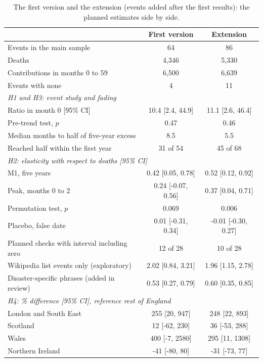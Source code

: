 \documentclass[11pt,a4paper]{article}
\begin{document}
\begin{table}[tbp]\centering\small\begin{threeparttable}\caption{The first version and the extension (events added after the first results): the planned estimates side by side.}\label{tab:ext}\begin{tabular}{lcc}\toprule & First version & Extension\\\midrule
Events in the main sample & 64 & 86\\
Deaths & 4,346 & 5,330\\
Contributions in months 0 to 59 & 6,500 & 6,639\\
Events with none & 4 & 11\\
\multicolumn{3}{l}{\textit{H1 and H3: event study and fading}}\\
\quad Ratio in month 0 [95\% CI] & 10.4 [2.4, 44.9] & 11.1 [2.6, 46.4]\\
\quad Pre-trend test, $p$ & 0.47 & 0.46\\
\quad Median months to half of five-year excess & 8.5 & 5.5\\
\quad Reached half within the first year & 31 of 54 & 45 of 68\\
\multicolumn{3}{l}{\textit{H2: elasticity with respect to deaths [95\% CI]}}\\
\quad M1, five years & 0.42 [0.05, 0.78] & 0.52 [0.12, 0.92]\\
\quad Peak, months 0 to 2 & 0.24 [-0.07, 0.56] & 0.37 [0.04, 0.71]\\
\quad Permutation test, $p$ & 0.069 & 0.006\\
\quad Placebo, false date & 0.01 [-0.31, 0.34] & -0.01 [-0.30, 0.27]\\
\quad Planned checks with interval including zero & 12 of 28 & 10 of 28\\
\quad Wikipedia list events only (exploratory) & 2.02 [0.84, 3.21] & 1.96 [1.15, 2.78]\\
\quad Disaster-specific phrases (added in review) & 0.53 [0.27, 0.79] & 0.60 [0.35, 0.85]\\
\multicolumn{3}{l}{\textit{H4: \% difference [95\% CI], reference rest of England}}\\
\quad London and South East & 255 [20, 947] & 248 [22, 893]\\
\quad Scotland & 12 [-62, 230] & 36 [-53, 288]\\
\quad Wales & 400 [-7, 2580] & 295 [11, 1308]\\
\quad Northern Ireland & -41 [-80, 80] & -31 [-73, 77]\\

\end{tabular}
\end{threeparttable}
\end{table}
\end{document}
